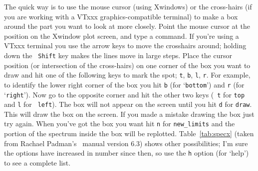 The quick way is to use the mouse cursor (using Xwindows) or the
cross-hairs (if you are working with a VTxxx graphics-compatible
terminal) to make a box around the part you want to look at more
closely. Point the mouse cursor at the position on the Xwindow plot
screen, and type a command. If you're using a VTxxx terminal you use
the arrow keys to move the crosshairs around; holding down the {\tt
Shift} key makes the lines move in large steps.  Place the cursor
position (or intersection of the cross-hairs) on one corner of the box
you want to draw and hit one of the following keys to mark the spot;
{\tt t}, {\tt b}, {\tt l}, {\tt r}.  For example, to identify the
lower right corner of the box you hit {\tt b} (for `{\tt{bottom}}') and
{\tt r} (for `{\tt{right}}'). Now go to the opposite corner and hit the
other two keys (\ie\ {\tt t} for {\tt top} and {\tt l} for {\tt
left}). The box will not appear on the screen until you hit {\tt d}
for {\tt draw}.  This will draw the box on the screen. If you made a
mistake drawing the box just try again.  When
you've got the box you want hit {\tt n} for {\tt new\_limits} and the
portion of the spectrum inside the box will be replotted.
Table~\ref{tab:specx} (taken from Rachael Padman's \SPECX\ manual
version 6.3) shows other possibilities; I'm sure the options have
increased in number since then, so use the {\tt h} option (for `help')
to see a complete list.


